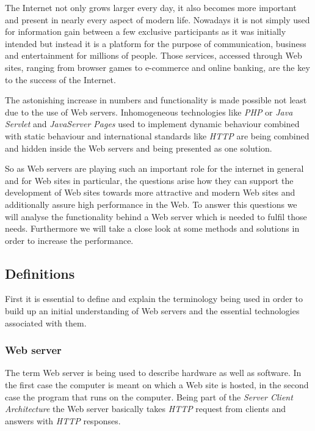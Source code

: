 \documentclass[
  a4paper,               %
  twoside,               %
  headings=small,        %
  DIV=12,                %
  BCOR=1cm,              %
  headinclude=true,      %
  footinclude=true,      %
  numbers=noenddot,      %
  11pt]{scrartcl}        %
\begin{document}
The Internet not only grows larger every day, it also becomes more important and present in nearly every aspect of modern life. Nowadays it is not simply used for information gain between a few exclusive participants as it was initially intended but instead it is a platform for the purpose of communication, business and entertainment for millions of people. Those services, accessed through Web sites, ranging from browser games to e-commerce and online banking, are the key to the success of the Internet. \smallskip

The astonishing increase in numbers and functionality is made possible not least due to the use of Web servers. Inhomogeneous technologies like \textit{PHP} or \textit{Java Servlet} and \textit{JavaServer Pages} used to implement dynamic behaviour combined with static behaviour and international standards like \textit{HTTP} are being combined and hidden inside the Web servers and being presented as one solution. \smallskip

So as Web servers are playing such an important role for the internet in general and for Web sites in particular, the questions arise how they can support the development of Web sites towards more attractive and modern Web sites and additionally assure high performance in the Web. To answer this questions we will analyse the functionality behind a Web server which is needed to fulfil those needs. Furthermore we will take a close look at some methods and solutions in order to increase the performance.

\subsection{Definitions}

First it is essential to define and explain the terminology being used in order to build up an initial understanding of Web servers and the essential technologies associated with them. 

\subsubsection{Web server}
The term Web server is being used to describe hardware as well as software. In the first case the computer is meant on which a Web site is hosted, in the second case the program that runs on the computer. Being part of the \textit{Server Client Architecture} the Web server basically takes \textit{HTTP} request from clients and answers with \textit{HTTP} responses. 
\end{document}

